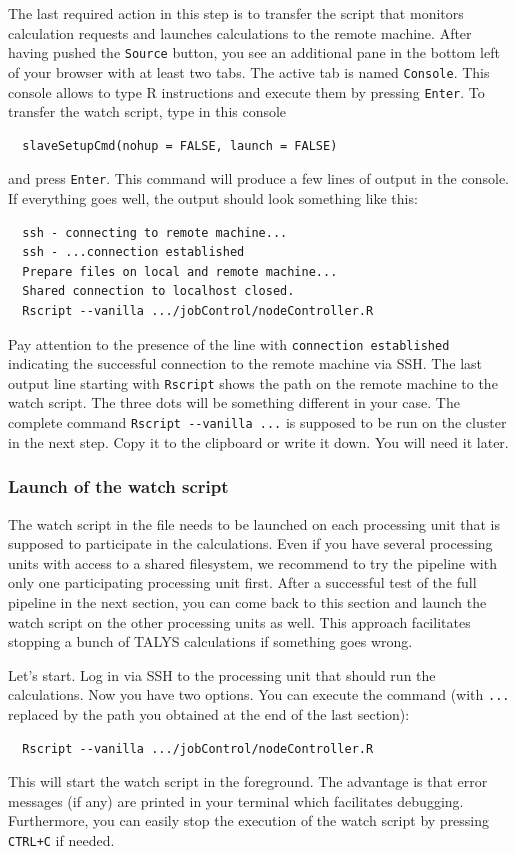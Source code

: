 \documentclass[12pt,a4paper]{scrartcl}
\begin{document}
The last required action in this step is to transfer the script that monitors calculation requests and launches calculations to the remote machine.
After having pushed the \verb|Source| button, you see an additional pane in the bottom left of your browser with at least two tabs.
The active tab is named \verb|Console|.
This console allows to type R instructions and execute them by pressing \verb|Enter|.
To transfer the watch script, type in this console
\begin{verbatim}
  slaveSetupCmd(nohup = FALSE, launch = FALSE)
\end{verbatim}
and press \verb|Enter|.
This command will produce a few lines of output in the console.
If everything goes well, the output should look something like this:
\begin{verbatim}
  ssh - connecting to remote machine...
  ssh - ...connection established
  Prepare files on local and remote machine...
  Shared connection to localhost closed.
  Rscript --vanilla .../jobControl/nodeController.R
\end{verbatim}
Pay attention to the presence of the line with \verb|connection established| indicating the successful connection to the remote machine via SSH.
The last output line starting with \verb|Rscript| shows the path on the remote machine to the watch script.
The three dots will be something different in your case.
The complete command \verb|Rscript --vanilla ...| is supposed to be run on the cluster in the next step.
Copy it to the clipboard or write it down.
You will need it later.

\subsubsection{Launch of the watch script}
\label{subsubsec:launch_watchscript}

The watch script in the file  needs to be launched on each processing unit that is supposed to participate in the calculations.
Even if you have several processing units with access to a shared filesystem, we recommend to try the pipeline with only one participating processing unit first.
After a successful test of the full pipeline in the next section, you can come back to this section and launch the watch script on the other processing units as well.
This approach facilitates stopping a bunch of TALYS calculations if something goes wrong.

Let's start.
Log in via SSH to the processing unit that should run the calculations.
Now you have two options.
You can execute the command (with \verb|...| replaced by the path you obtained at the end of the last section):
\begin{verbatim}
  Rscript --vanilla .../jobControl/nodeController.R
\end{verbatim}
This will start the watch script in the foreground.
The advantage is that error messages (if any) are printed in your terminal which facilitates debugging.
Furthermore, you can easily stop the execution of the watch script by pressing \verb|CTRL+C| if needed.
\end{document}
